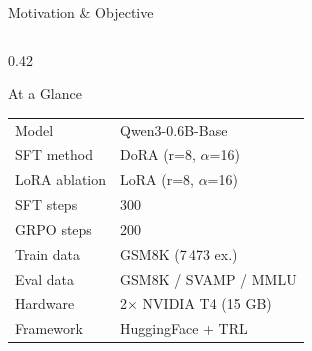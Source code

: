 \documentclass[aspectratio=169,10pt]{beamer}
\begin{document}
\begin{frame}{Motivation \& Objective}
\begin{columns}[T]
    \begin{column}{0.42\textwidth}
      \begin{block}{At a Glance}
        \small
        \begin{tabular}{ll}
          \toprule
          Model        & Qwen3-0.6B-Base \\
          SFT method   & DoRA (r=8, $\alpha$=16) \\
          LoRA ablation & LoRA (r=8, $\alpha$=16) \\
          SFT steps    & 300 \\
          GRPO steps   & 200 \\
          Train data   & GSM8K (7\,473 ex.) \\
          Eval data    & GSM8K / SVAMP / MMLU \\
          Hardware     & 2$\times$ NVIDIA T4 (15 GB) \\
          Framework    & HuggingFace + TRL \\
          \bottomrule
        \end{tabular}
      \end{block}
    \end{column}
  \end{columns}
\end{frame}
\end{document}
